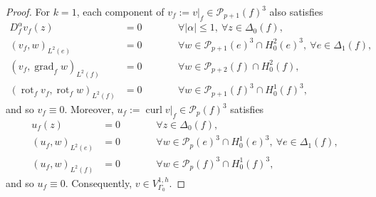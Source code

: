 \documentclass[10pt,a4paper]{amsart}
\DeclareMathOperator{\curl}{curl}
\begin{document}
\begin{proof}
	For $k=1$, each component of 
	$v_f := v|_{f} \in \mathcal{P}_{p+1}(f)^3$ also satisfies 
	\begin{subequations}
		\label{eq:proof:Pp3-face-dofs}
		\begin{alignat}{2}
			D_f^{\alpha} v_f (z) &= 0 \qquad & &\forall |\alpha| \leq 1, 
			\ \forall z \in \Delta_0(f), \\
			(v_f, w)_{L^2(e)} &= 0 
			\qquad & &\forall w \in \mathcal{P}_{p+1}(e)^3 \cap H^2_0(e)^3, \ 
			\forall e \in \Delta_1(f),  \\
			\label{eq:proof:Pp3-face-dofs-interior-face}
			(v_f, \operatorname{grad}_f w)_{L^2(f)} &=0 
			\qquad & &\forall w \in \mathcal{P}_{p+2}(f) \cap H^2_0(f),\\
			(\operatorname{rot}_fv_f, \operatorname{rot}_fw)_{L^2(f)} &=0 
			\qquad & &\forall w \in \mathcal{P}_{p+1}(f)^3 \cap H^1_0(f)^3,
		\end{alignat}	
	\end{subequations}	 and so 
	$v_f \equiv 0$. Moreover, $u_f := \curl v|_f
	\in \mathcal{P}_p(f)^3$ satisfies	
	\begin{subequations}
		\label{eq:proof:Pp-face-dofs}
		\begin{alignat}{2}
			u_f (z) &= 0 
			\qquad & &\forall z \in \Delta_0(f), \\
			(u_f, w)_{L^2(e)} &= 0 
			\qquad & &\forall w \in \mathcal{P}_{p}(e)^3 
			\cap H^1_0(e)^3, \ \forall e \in \Delta_1(f), \\
			(u_f, w)_{L^2(f)} &=0 
			\qquad & &\forall w \in \mathcal{P}_{p}(f)^3 
			\cap H^1_0(f)^3,
		\end{alignat}	
	\end{subequations}
	and so $u_f \equiv 0$. Consequently, $v \in V_{\Gamma_0}^{1, h}$.
\end{proof}
\end{document}
